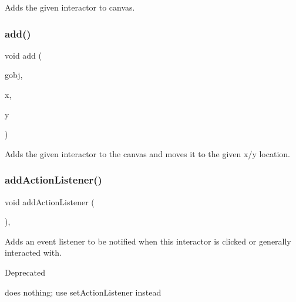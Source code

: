 Adds the given interactor to canvas. 

\mbox{\label{classGCanvas_a5b11b532869632a6c26b098b0858eac5}} 
\subsubsection{\texorpdfstring{add()}{add()}\hspace{0.1cm}{\footnotesize\ttfamily [4/4]}}
{\footnotesize\ttfamily void add (\begin{DoxyParamCaption}\item[{\mbox{\hyperlink{classGObject}{G\+Object}} \&}]{gobj,  }\item[{double}]{x,  }\item[{double}]{y }\end{DoxyParamCaption})\hspace{0.3cm}{\ttfamily [virtual]}}



Adds the given interactor to the canvas and moves it to the given x/y location. 

\mbox{\label{classGInteractor_a02f20ea6edfa0671f31c4c648a253833}} 
\subsubsection{\texorpdfstring{add\+Action\+Listener()}{addActionListener()}}
{\footnotesize\ttfamily void add\+Action\+Listener (\begin{DoxyParamCaption}{ }\end{DoxyParamCaption})\hspace{0.3cm}{\ttfamily [virtual]}, {\ttfamily [inherited]}}



Adds an event listener to be notified when this interactor is clicked or generally interacted with. 

\begin{DoxyRefDesc}{Deprecated}
\item[\mbox{\hyperlink{deprecated__deprecated000006}{Deprecated}}]does nothing; use set\+Action\+Listener instead \end{DoxyRefDesc}
\mbox{\label{classGDrawingSurface_a3a690bcb2d62250c9e4722ad7c1b9ab6}} 
